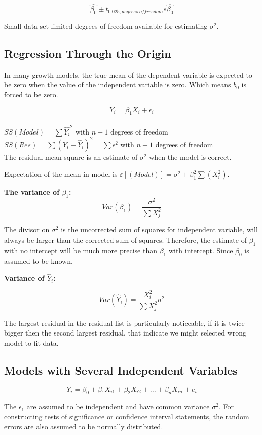 \documentclass[12pt]{article}
\begin{document}
$$\hat{\beta_0} \pm t_{0.025, degrees\ of freedom}s\hat{\beta_0}$$


Small data set limited degrees of freedom available for estimating $\sigma^2$.

\subsection{Regression Through the Origin}


In many growth models, the true mean of the dependent variable is expected to be zero when 
the value of the independent variable is zero.
Which means $b_0$ is forced to be zero.

$$Y_i = \beta_1X_i + \epsilon_i$$
\\
$SS(Model)= \sum\hat{Y_i}^2$ with $n-1$ degrees of freedom\\
$SS(Res)= \sum(Y_i-\hat{Y}_i)^2 = \sum\epsilon^2$ with $n-1$ degrees of freedom\\

The residual mean square is an estimate of $\sigma^2$ when the model is correct.

Expectation of the mean in model is $\varepsilon[(Model)] = \sigma^2 + \beta_1^2\sum(X_i^2).$

\textbf{The variance of $\beta_1$:}
$$Var(\beta_1) = \frac{\sigma^2}{\sum X_j^2}$$

The divisor on $\sigma^2$ is the uncorrected sum of squares for independent variable, will always be larger than the corrected sum of squares. Therefore, the estimate of $\beta_1$ with no intercept will be much more precise than $\beta_1$ with intercept. Since $\beta_0$ is assumed to be known.

\textbf{Variance of $\hat{Y}_i$:}

$$Var(\hat{Y}_i) = \frac{X_i^2}{\sum X_j^2} \sigma^2$$

The largest residual in the residual list is particularly noticeable, if it is twice bigger
then the second largest residual, that indicate we might selected wrong model to fit data.

\subsection{Models with Several Independent Variables}

$$Y_i = \beta_0 + \beta_1X_{i1} + \beta_2X_{i2} + ... + \beta_nX_{in} + e_i$$

The $\epsilon_1$ are assumed to be independent and have common variance $\sigma^2$.
For constructing tests of significance or confidence interval statements, the random errors are also assumed to be normally distributed.
\end{document}
